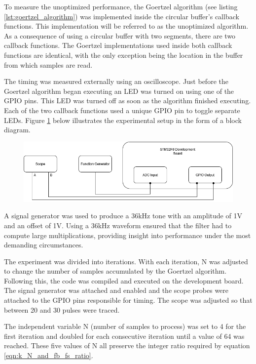 To measure the unoptimized performance, the Goertzel algorithm (see listing \ref{lst:goertzel_algorithm}) was implemented inside the circular buffer's callback functions. This implementation will be referred to as the unoptimized algorithm. As a consequence of using a circular buffer with two segments, there are two callback functions. The Goertzel implementations used inside both callback functions are identical, with the only exception being the location in the buffer from which samples are read.

The timing was measured externally using an oscilloscope. Just before the Goertzel algorithm began executing an LED was turned on using one of the GPIO pins. This LED was turned off as soon as the algorithm finished executing. Each of the two callback functions used a unique GPIO pin to toggle separate LEDs. Figure \ref{fig:goertzel_optimization_experiemnt} below illustrates the experimental setup in the form of a block diagram.

\begin{figure}[H]
	\centering
	\includegraphics[width=.9\linewidth]{figures/experimentation/goertzel_speed_test_diagram.png}
	\label{fig:goertzel_optimization_experiemnt}
\end{figure}

A signal generator was used to produce a 36kHz tone with an amplitude of 1V and an offset of 1V. Using a 36kHz waveform ensured that the filter had to compute large multiplications, providing insight into performance under the most demanding circumstances.

The experiment was divided into iterations. With each iteration, N was adjusted to change the number of samples accumulated by the Goertzel algorithm. Following this, the code was compiled and executed on the development board. The signal generator was attached and enabled and the scope probes were attached to the GPIO pins responsible for timing. The scope was adjusted so that between 20 and 30 pulses were traced. 

The independent variable N (number of samples to process) was set to 4 for the first iteration and doubled for each consecutive iteration until a value of 64 was reached. These five values of N all preserve the integer ratio required by equation \ref{eqn:k_N_and_fb_fs_ratio}.

